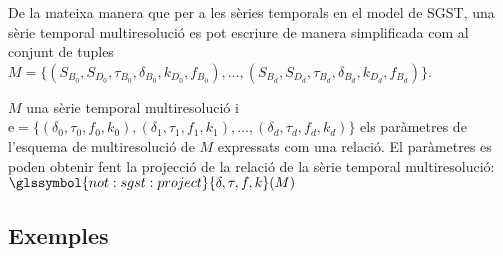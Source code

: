De la mateixa manera que per a les sèries temporals en el model de
\gls{SGST}, una sèrie temporal multiresolució es pot escriure de manera
simplificada com al conjunt de tuples $M = \{ (S_{B_0}, S_{D_0} ,
\tau_{B_0}, \delta_{B_0}, k_{D_0}, f_{B_0} ), \dotsc, (S_{B_d},
S_{D_d} , \tau_{B_d}, \delta_{B_d}, k_{D_d}, f_{B_d} ) \}$.




$M$ una sèrie temporal
multiresolució i $\text{e} = \{ (\delta_0,\tau_0,f_0,k_0),
(\delta_1,\tau_1,f_1,k_1), \ldots, (\delta_d,\tau_d,f_d,k_d)\}$ els
paràmetres de l'esquema de multiresolució de $M$ expressats com una relació. El paràmetres es poden obtenir fent la projecció de la relació de la sèrie temporal multiresolució: $\glssymbol{not:sgst:project}{\delta,\tau,f,k}(M)$









\subsection{Exemples}

